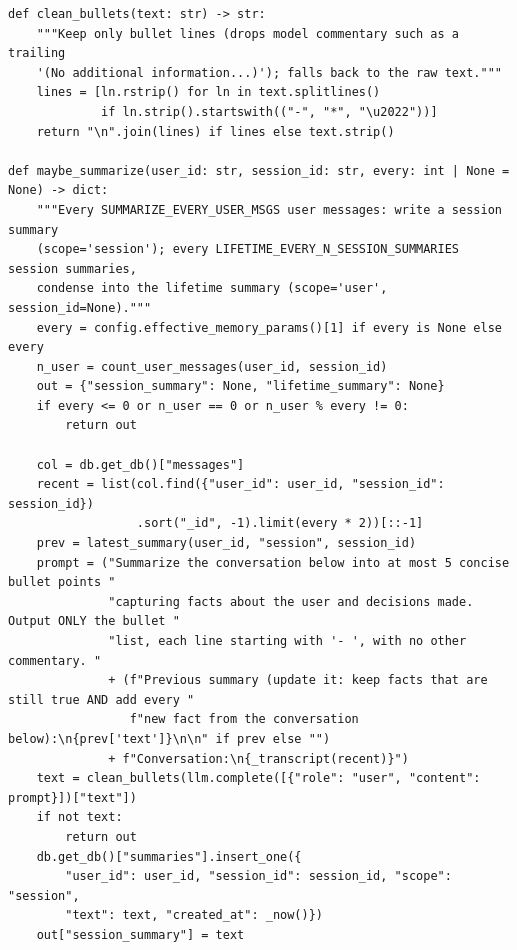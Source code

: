 \documentclass[11pt]{article}
\begin{document}
\begingroup\lstset{basicstyle=\ttfamily\scriptsize}
\begin{lstlisting}
def clean_bullets(text: str) -> str:
    """Keep only bullet lines (drops model commentary such as a trailing
    '(No additional information...)'); falls back to the raw text."""
    lines = [ln.rstrip() for ln in text.splitlines()
             if ln.strip().startswith(("-", "*", "\u2022"))]
    return "\n".join(lines) if lines else text.strip()

def maybe_summarize(user_id: str, session_id: str, every: int | None = None) -> dict:
    """Every SUMMARIZE_EVERY_USER_MSGS user messages: write a session summary
    (scope='session'); every LIFETIME_EVERY_N_SESSION_SUMMARIES session summaries,
    condense into the lifetime summary (scope='user', session_id=None)."""
    every = config.effective_memory_params()[1] if every is None else every
    n_user = count_user_messages(user_id, session_id)
    out = {"session_summary": None, "lifetime_summary": None}
    if every <= 0 or n_user == 0 or n_user % every != 0:
        return out

    col = db.get_db()["messages"]
    recent = list(col.find({"user_id": user_id, "session_id": session_id})
                  .sort("_id", -1).limit(every * 2))[::-1]
    prev = latest_summary(user_id, "session", session_id)
    prompt = ("Summarize the conversation below into at most 5 concise bullet points "
              "capturing facts about the user and decisions made. Output ONLY the bullet "
              "list, each line starting with '- ', with no other commentary. "
              + (f"Previous summary (update it: keep facts that are still true AND add every "
                 f"new fact from the conversation below):\n{prev['text']}\n\n" if prev else "")
              + f"Conversation:\n{_transcript(recent)}")
    text = clean_bullets(llm.complete([{"role": "user", "content": prompt}])["text"])
    if not text:
        return out
    db.get_db()["summaries"].insert_one({
        "user_id": user_id, "session_id": session_id, "scope": "session",
        "text": text, "created_at": _now()})
    out["session_summary"] = text


\end{lstlisting}
\end{document}
